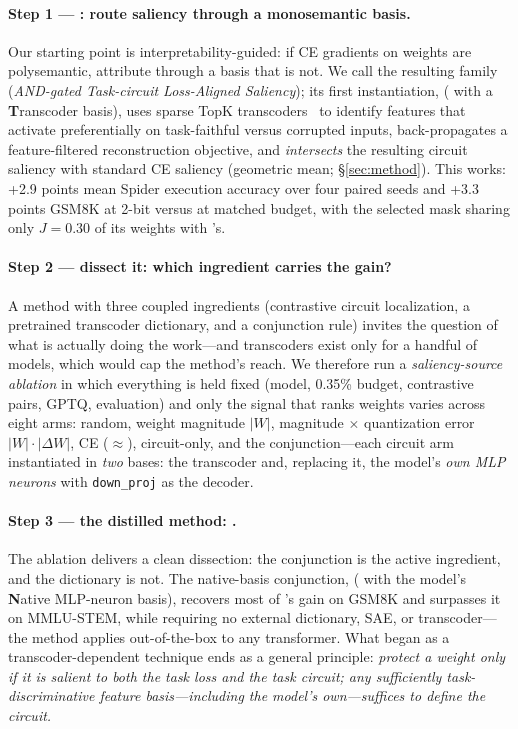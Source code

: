 \paragraph{Step 1 --- \method{}: route saliency through a monosemantic basis.}
Our starting point is interpretability-guided: if CE gradients on weights are
polysemantic, attribute through a basis that is not. We call the resulting
family \family{} (\emph{AND-gated Task-circuit Loss-Aligned Saliency}); its
first instantiation, \method{} (\family{} with a \textbf{T}ranscoder basis),
uses sparse TopK
transcoders~\citep{dunefsky2024transcoders} to identify features that activate
preferentially on task-faithful versus corrupted inputs, back-propagates a
feature-filtered reconstruction objective, and \emph{intersects} the resulting
circuit saliency with standard CE saliency (geometric mean;
\S\ref{sec:method}). This works: +2.9 points mean Spider execution accuracy
over four paired seeds and +3.3 points GSM8K at 2-bit versus \baseline{} at
matched budget, with the selected mask sharing only $J{=}0.30$ of its weights
with \baseline{}'s.

\paragraph{Step 2 --- dissect it: which ingredient carries the gain?}
A method with three coupled ingredients (contrastive circuit localization, a
pretrained transcoder dictionary, and a conjunction rule) invites the question
of what is actually doing the work---and transcoders exist only for a handful
of models, which would cap the method's reach. We therefore run a
\emph{saliency-source ablation} in which everything is held fixed (model,
0.35\% budget, contrastive pairs, GPTQ, evaluation) and only the signal that
ranks weights varies across eight arms: random, weight magnitude $|W|$,
magnitude $\times$ quantization error $|W|\cdot|\Delta W|$, CE
($\approx$\baseline{}), circuit-only, and the conjunction---each circuit arm
instantiated in \emph{two} bases: the transcoder and, replacing it, the
model's \emph{own MLP neurons} with \texttt{down\_proj} as the decoder.

\paragraph{Step 3 --- the distilled method: \methodfree{}.}
The ablation delivers a clean dissection: the conjunction is the active
ingredient, and the dictionary is not. The native-basis conjunction,
\methodfree{} (\family{} with the model's \textbf{N}ative MLP-neuron basis),
recovers most of \method{}'s gain on GSM8K and surpasses it on
MMLU-STEM, while requiring no external dictionary, SAE, or transcoder---the
method applies out-of-the-box to any transformer. What began as a
transcoder-dependent technique ends as a general principle: \emph{protect a
weight only if it is salient to both the task loss and the task circuit; any
sufficiently task-discriminative feature basis---including the model's
own---suffices to define the circuit.}

